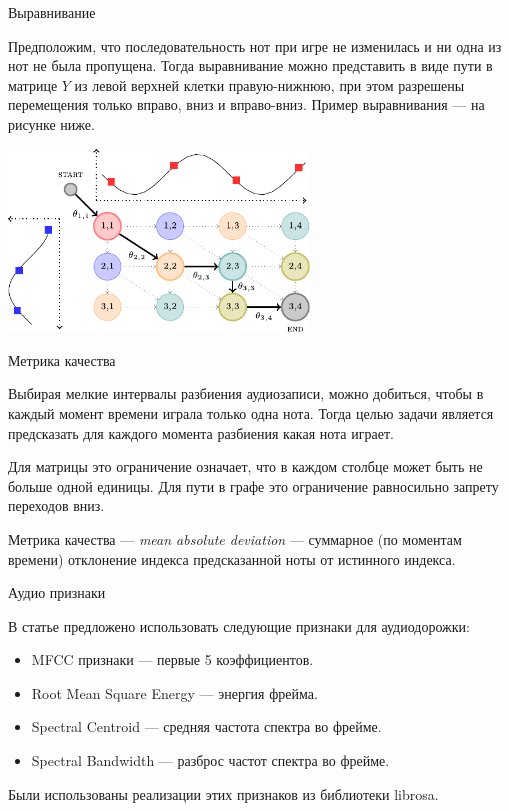 \documentclass[unicode, dvipsnames]{beamer}
\begin{document}
\begin{frame}{Выравнивание}

Предположим, что последовательность нот при игре не изменилась и ни одна из нот не была пропущена. Тогда выравнивание можно представить в виде пути в матрице $Y$ из левой верхней клетки правую-нижнюю, при этом разрешены перемещения только вправо, вниз и вправо-вниз. Пример выравнивания --- на рисунке ниже.

\bigskip
\centering
\includegraphics[width=0.6\textwidth]{graphics/align_example.pdf}

\end{frame}

\begin{frame}{Метрика качества}

Выбирая мелкие интервалы разбиения аудиозаписи, можно добиться, чтобы в каждый момент времени играла только одна нота. Тогда целью задачи является предсказать для каждого момента разбиения какая нота играет. 

\bigskip
Для матрицы это ограничение означает, что в каждом столбце может быть не больше одной единицы. Для пути в графе это ограничение равносильно запрету переходов вниз.

\bigskip
Метрика качества --- \textit{mean absolute deviation} --- суммарное (по моментам времени) отклонение индекса предсказанной ноты от истинного индекса.

\end{frame}

\begin{frame}{Аудио признаки}

В статье предложено использовать следующие признаки для аудиодорожки:

\bigskip
\begin{itemize}
	\item MFCC признаки --- первые 5 коэффициентов.
	\item Root Mean Square Energy --- энергия фрейма.
	\item Spectral Centroid --- средняя частота спектра во фрейме.
	\item Spectral Bandwidth --- разброс частот спектра во фрейме.
\end{itemize}

\bigskip
Были использованы реализации этих признаков из библиотеки librosa.

\end{frame}
\end{document}
